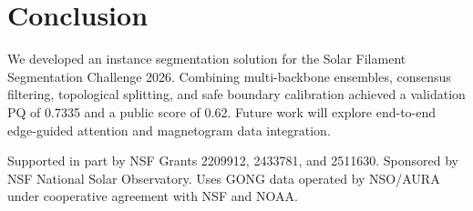 \documentclass[sigconf]{acmart}
\begin{document}
\section{Conclusion}
We developed an instance segmentation solution for the Solar Filament Segmentation Challenge 2026. Combining multi-backbone ensembles, consensus filtering, topological splitting, and safe boundary calibration achieved a validation PQ of 0.7335 and a public score of 0.62. Future work will explore end-to-end edge-guided attention and magnetogram data integration.

\begin{acks}
Supported in part by NSF Grants 2209912, 2433781, and 2511630. Sponsored by NSF National Solar Observatory. Uses GONG data operated by NSO/AURA under cooperative agreement with NSF and NOAA.
\end{acks}



\end{document}
